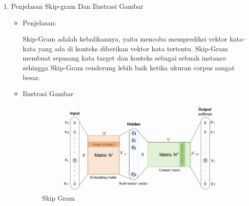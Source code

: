 \begin{enumerate}
\begin{itemize}
\end{itemize}

\item Penjelasan Skip-gram Dan Ilustrasi Gambar
\begin{itemize}
\item  Penjelasan:

Skip-Gram adalah kebalikannya, yaitu mencoba memprediksi vektor kata-kata yang ada di konteks diberikan vektor kata tertentu. Skip-Gram membuat sepasang kata target dan konteks sebagai sebuah instance sehingga Skip-Gram cenderung lebih baik ketika ukuran corpus sangat besar. 

\item Ilustrasi Gambar

\begin{figure}[H]
\centering
\includegraphics[scale=0.5]{figures/1174051/5/1.jpg}
\caption{Skip Gram}
\label{Skip Gram}
\end{figure}
\par
\par
\end{itemize}
\par
\par
\end{enumerate}

